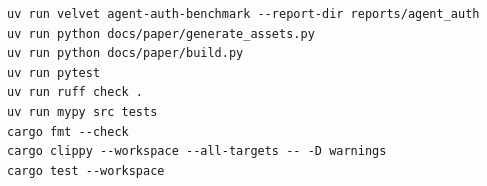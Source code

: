 \begin{verbatim}
uv run velvet agent-auth-benchmark --report-dir reports/agent_auth
uv run python docs/paper/generate_assets.py
uv run python docs/paper/build.py
uv run pytest
uv run ruff check .
uv run mypy src tests
cargo fmt --check
cargo clippy --workspace --all-targets -- -D warnings
cargo test --workspace
\end{verbatim}
